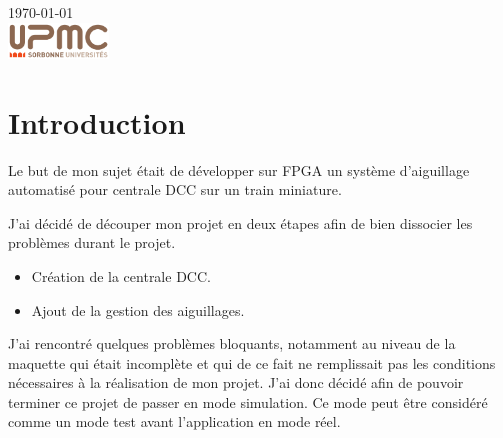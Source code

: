 \begin{titlepage}
{\large \today}\\[2cm] %


\includegraphics[width=0.2\textwidth]{logo.png}


\vfill %

\end{titlepage}




\section{Introduction}
\label{sec:introduction}

Le but de mon sujet était de développer sur FPGA un système
d'aiguillage automatisé pour centrale DCC sur un train miniature.

J'ai décidé de découper mon projet en deux étapes afin de bien dissocier les problèmes durant le projet.

\medskip

\begin{itemize}
  \item Création de la centrale DCC.
  \item Ajout de la gestion des aiguillages.
\end{itemize}  

\medskip

J'ai rencontré quelques problèmes bloquants, notamment au niveau de la
maquette  qui était incomplète et qui de ce fait ne remplissait pas
les conditions nécessaires  à la réalisation de mon projet. J'ai donc
décidé afin de pouvoir terminer ce  projet de passer en mode
simulation. Ce mode peut être considéré comme un mode test avant
l'application en mode  réel.


